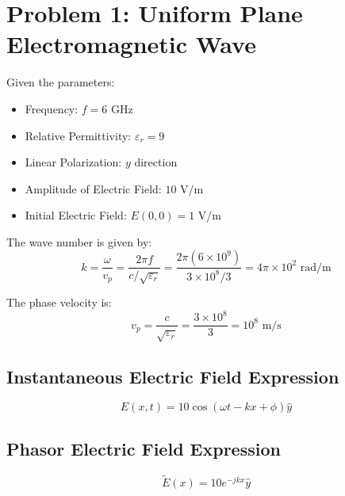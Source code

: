 \documentclass{include/src/sbu-report}  %
\begin{document}

\maketitle  %


\section{Problem 1: Uniform Plane Electromagnetic Wave}
Given the parameters:
\begin{itemize}
    \item Frequency: $f = 6$ GHz
    \item Relative Permittivity: $\varepsilon_r = 9$
    \item Linear Polarization: $y$ direction
    \item Amplitude of Electric Field: $10$ V/m
    \item Initial Electric Field: $E(0,0) = 1$ V/m
\end{itemize}

The wave number is given by:
\begin{equation}
    k = \frac{\omega}{v_p} = \frac{2\pi f}{c / \sqrt{\varepsilon_r}} = \frac{2\pi (6 \times 10^9)}{3 \times 10^8 / 3} = 4\pi \times 10^2 \text{ rad/m}
\end{equation}

The phase velocity is:
\begin{equation}
    v_p = \frac{c}{\sqrt{\varepsilon_r}} = \frac{3 \times 10^8}{3} = 10^8 \text{ m/s}
\end{equation}

\subsection{Instantaneous Electric Field Expression}
\begin{equation}
    E(x,t) = 10 \cos(\omega t - kx + \phi) \hat{y}
\end{equation}

\subsection{Phasor Electric Field Expression}
\begin{equation}
    \tilde{E}(x) = 10 e^{-jkx} \hat{y}
\end{equation}
\end{document}
